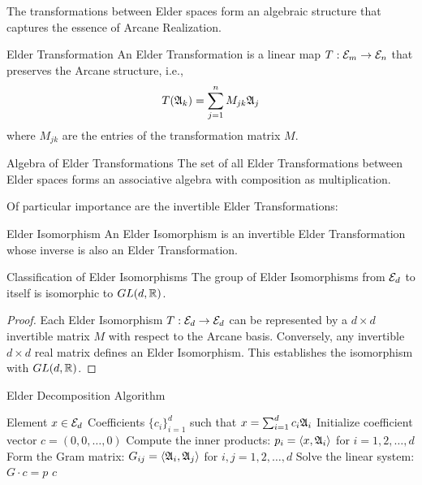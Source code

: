 \begin{twocolumnlayout}
The transformations between Elder spaces form an algebraic structure that captures the essence of Arcane Realization.

\begin{definition}{Elder Transformation}{}
An Elder Transformation is a linear map $T: \mathcal{E}_{m} \to \mathcal{E}_{n}$ that preserves the Arcane structure, i.e.,
\begin{equation}
T(\mathfrak{A}_{k}) = \sum_{j=1}^{n} M_{jk} \mathfrak{A}_{j}
\end{equation}
where $M_{jk}$ are the entries of the transformation matrix $M$.
\end{definition}

\begin{proposition}{Algebra of Elder Transformations}{}
The set of all Elder Transformations between Elder spaces forms an associative algebra with composition as multiplication.
\end{proposition}

Of particular importance are the invertible Elder Transformations:

\begin{definition}{Elder Isomorphism}{}
An Elder Isomorphism is an invertible Elder Transformation whose inverse is also an Elder Transformation.
\end{definition}

\begin{theorem}{Classification of Elder Isomorphisms}{}
The group of Elder Isomorphisms from $\mathcal{E}_{d}$ to itself is isomorphic to $GL(d, \mathbb{R})$.
\end{theorem}

\begin{proof}
Each Elder Isomorphism $T: \mathcal{E}_{d} \to \mathcal{E}_{d}$ can be represented by a $d \times d$ invertible matrix $M$ with respect to the Arcane basis. Conversely, any invertible $d \times d$ real matrix defines an Elder Isomorphism. This establishes the isomorphism with $GL(d, \mathbb{R})$.
\end{proof}

\begin{algorithm}{Elder Decomposition Algorithm}
\caption{Decomposition of an element into Arcane basis}
\begin{algorithmic}[1]
\Input Element $x \in \mathcal{E}_{d}$
\Output Coefficients $\{c_i\}_{i=1}^d$ such that $x = \sum_{i=1}^d c_i \mathfrak{A}_{i}$
\State Initialize coefficient vector $c = (0, 0, \ldots, 0)$
\State Compute the inner products: $p_i = \langle x, \mathfrak{A}_{i} \rangle$ for $i = 1, 2, \ldots, d$
\State Form the Gram matrix: $G_{ij} = \langle \mathfrak{A}_{i}, \mathfrak{A}_{j} \rangle$ for $i, j = 1, 2, \ldots, d$
\State Solve the linear system: $G \cdot c = p$
\State \Return $c$
\end{algorithmic}
\end{algorithm}

\end{twocolumnlayout}

